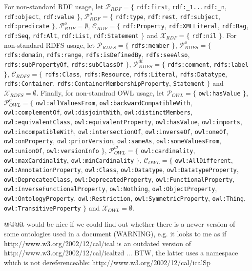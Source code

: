 \documentclass{llncs}
\newcommand{\CRDF}{\ensuremath{\mathcal{C}_{RDF}}\xspace}
\newcommand{\PRDF}{\ensuremath{\mathcal{P}_{RDF}}\xspace}
\newcommand{\PoRDF}{\ensuremath{\mathcal{P}_{RDF}^{o}}\xspace}
\newcommand{\XRDF}{\ensuremath{\mathcal{X}_{RDF}}\xspace}
\newcommand{\CRDFS}{\ensuremath{\mathcal{C}_{RDFS}}\xspace}
\newcommand{\PRDFS}{\ensuremath{\mathcal{P}_{RDFS}}\xspace}
\newcommand{\PdtRDFS}{\ensuremath{\mathcal{P}_{RDFS}^{dt}}\xspace}
\newcommand{\PoRDFS}{\ensuremath{\mathcal{P}_{RDFS}^{o}}\xspace}
\newcommand{\XRDFS}{\ensuremath{\mathcal{X}_{RDFS}}\xspace}
\newcommand{\COWL}{\ensuremath{\mathcal{C}_{OWL}}\xspace}
\newcommand{\POWL}{\ensuremath{\mathcal{P}_{OWL}}\xspace}
\newcommand{\PdtOWL}{\ensuremath{\mathcal{P}_{OWL}^{dt}}\xspace}
\newcommand{\PoOWL}{\ensuremath{\mathcal{P}_{OWL}^{o}}\xspace}
\newcommand{\XOWL}{\ensuremath{\mathcal{X}_{OWL}}\xspace}
\begin{document}
For non-standard RDF usage, let $\PRDF = \{$ {\tt\small rdf:first}, {\tt\small rdf:\_1...rdf:\_n}, {\tt\small rdf:object}, {\tt\small rdf:value} $\}$, $\PoRDF = \{$ {\tt\small rdf:type}, {\tt\small rdf:rest}, {\tt\small rdf:subject}, {\tt\small rdf:predicate} $\}$, $\PoRDF = \emptyset$, $\CRDF = \{$ {\tt\small rdf:Property}, {\tt\small rdf:XMLLiteral}, {\tt\small rdf:Bag}, {\tt\small rdf:Seq}, {\tt\small rdf:Alt}, {\tt\small rdf:List}, {\tt\small rdf:Statement} $\}$  and $\XRDF = \{$ {\tt\small rdf:nil} $\}$. 
For non-standard RDFS usage, let $\PRDFS = \{$ {\tt\small rdfs:member} $\}$, $\PoRDFS = \{$ {\tt\small rdfs:domain}, {\tt\small rdfs:range}, {\tt\small rdfs:isDefinedBy}, {\tt\small rdfs:seeAlso}, {\tt\small rdfs:subPropertyOf}, {\tt\small rdfs:subClassOf} $\}$, $\PdtRDFS = \{$ {\tt\small rdfs:comment}, {\tt\small rdfs:label} $\}$, $\CRDFS = \{$ {\tt\small rdfs:Class}, {\tt\small rdfs:Resource}, {\tt\small rdfs:Literal}, {\tt\small rdfs:Datatype}, {\tt\small rdfs:Container}, {\tt\small rdfs:ContainerMembershipProperty}, {\tt\small Statement} $\}$  and $\XRDFS = \emptyset$. Finally, for non-standrad OWL usage, let $\POWL = \{$ {\tt\small owl:hasValue} $\}$, $\PoOWL = \{$ {\tt\small owl:allValuesFrom}, {\tt\small owl:backwardCompatibleWith}, {\tt\small owl:complementOf}, {\tt\small owl:disjointWith}, {\tt\small owl:distinctMembers}, {\tt\small owl:equivalentClass}, {\tt\small owl:equivalentProperty}, {\tt\small owl:hasValue}, {\tt\small owl:imports}, {\tt\small owl:incompatibleWith}, {\tt\small owl:intersectionOf}, {\tt\small owl:inverseOf}, {\tt\small owl:oneOf}, {\tt\small owl:onProperty}, {\tt\small owl:priorVersion}, {\tt\small owl:sameAs}, {\tt\small owl:someValuesFrom}, {\tt\small owl:unionOf}, {\tt\small owl:versionInfo} $\}$, $\PdtOWL = \{$ {\tt\small owl:cardinality}, {\tt\small owl:maxCardinality}, {\tt\small owl:minCardinality}  $\}$, $\COWL = \{$ {\tt\small owl:AllDifferent}, {\tt\small owl:AnnotationProperty}, {\tt\small owl:Class}, {\tt\small owl:Datatype}, {\tt\small owl:DatatypeProperty}, {\tt\small owl:DeprecatedClass}, {\tt\small owl:DeprecatedProperty}, {\tt\small owl:FunctionalProperty}, {\tt\small owl:InverseFunctionalProperty}, {\tt\small owl:Nothing}, {\tt\small owl:ObjectProperty}, {\tt\small owl:OntologyProperty}, {\tt\small owl:Restriction}, {\tt\small owl:SymmetricProperty}, {\tt\small owl:Thing}, {\tt\small owl:TransitiveProperty} $\}$   and $\XOWL = \emptyset$.


@@@it would be nice if we could find out whether there is a newer version of some ontologies used in a document (WARNING), e.g. it looks to me as if http://www.w3.org/2002/12/cal/ical is an outdated version of http://www.w3.org/2002/12/cal/icaltzd ... BTW, the latter uses a namespace which is not dereferenceable: http://www.w3.org/2002/12/cal/icalSp
\end{document}
